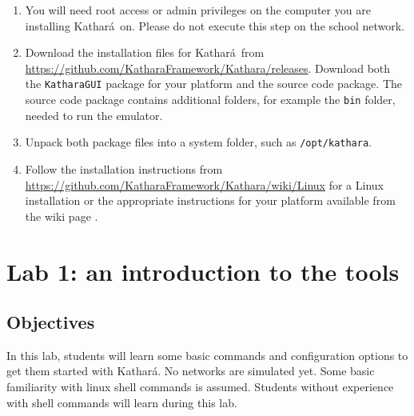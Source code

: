 \documentclass[12pt]{book}
\newcommand{\kathara}{Kathar\'a}
\begin{document}
\begin{enumerate}[label=(\arabic*)]
\item You will need root access or admin privileges on
  the computer you are installing \kathara\ on. Please do not execute
  this step on the school network.

\item Download the installation files for \kathara\ from
  \url{https://github.com/KatharaFramework/Kathara/releases}. 
Download both the \verb$KatharaGUI$ package for your platform and the
source code package. The source code package contains additional
folders, for example the \verb$bin$ folder, needed to run the
emulator. 

\item Unpack both package files into a system folder, such as
\verb$/opt/kathara$. 

\item Follow the installation instructions from
\url{https://github.com/KatharaFramework/Kathara/wiki/Linux} for a
Linux installation or the appropriate instructions for your platform
available from the wiki page \cite{kathara-wiki}. 

\end{enumerate}




\chapter{Lab 1: an introduction to the tools}

\section{Objectives}

In this lab, students will learn some basic commands and configuration options to get them started with \kathara. No networks are simulated yet. Some basic familiarity with linux shell commands is assumed. Students without experience with shell commands will learn during this lab.
\end{document}

